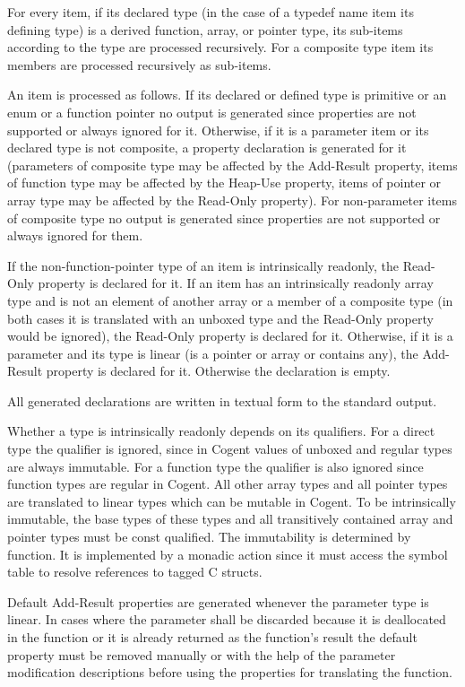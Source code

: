 For every item, if its declared type (in the case of a typedef name item its defining type) is
a derived function, array, or pointer type, its sub-items according to the 
type are processed recursively. For a composite type item its members are processed recursively as sub-items.

An item is processed as follows. If its declared or defined type is primitive or an enum or a function pointer no output 
is generated since properties are not 
supported or always ignored for it. Otherwise, if it is a parameter item or its declared type is not composite, a property
declaration is generated for it (parameters of composite type may be affected by the Add-Result property, items of function
type may be affected by the Heap-Use property, items of pointer or array type may be affected by the Read-Only property).
For non-parameter items of composite type no output is generated since properties are not 
supported or always ignored for them.

If the non-function-pointer type of an item is intrinsically readonly, the Read-Only property is declared for it. If an 
item has an intrinsically readonly array type and is not an element of another array or a member of a composite type (in both
cases it is translated with an unboxed type and the Read-Only property would be ignored), the Read-Only property
is declared for it. Otherwise, if it is a parameter and its type is linear (is a pointer or array or contains any),
the Add-Result property is declared for it. Otherwise the declaration is empty.

All generated declarations are written in textual form to the standard output.

Whether a type is intrinsically readonly depends on its  qualifiers. For a direct type the 
qualifier is ignored, since in Cogent values of unboxed and regular types are always immutable. For
a function type the qualifier is also ignored since function types are regular in Cogent. All other array types 
and all pointer types are translated to linear types which can be mutable in
Cogent. To be intrinsically immutable, the base types of these types and all transitively contained array and pointer 
types must be const qualified. The immutability is determined by function. It is implemented
by a monadic action since it must access the symbol table to resolve references to tagged C structs.

Default Add-Result properties are generated whenever the parameter type is linear. In cases where the parameter 
shall be discarded because it is deallocated in the function or it is already returned as the function's result
the default property must be removed manually or with the help of the parameter modification descriptions before
using the properties for translating the function.

